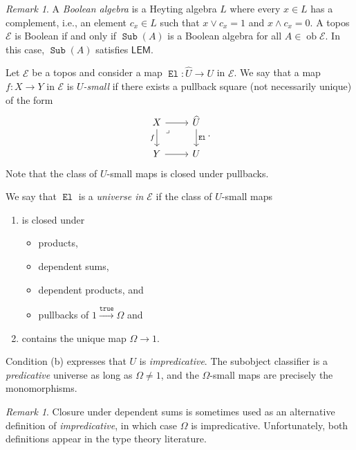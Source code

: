 \documentclass[10pt,letterpaper,cm]{nupset}
\theoremstyle{definition}
\theoremstyle{theorem}
\theoremstyle{remark}
\newtheorem{remark}[definition]{Remark}
\newcommand{\1}{\mathbf{1}}
\newcommand{\e}{\mathscr{E}}
\newcommand{\0}{\vec 0}
\DeclareMathOperator{\true}{\mathtt{true}}
\DeclareMathOperator{\ob}{ob}
\DeclareMathOperator{\el}{\mathtt{El}}
\DeclareMathOperator{\sub}{\mathtt{Sub}}
\newcommand{\bi}{\begin{itemize}}
\newcommand{\ei}{\end{itemize}}
\newcommand{\be}{\begin{enumerate}}
\newcommand{\ee}{\end{enumerate}}
\begin{document}
\begin{remark}
A \textit{Boolean algebra} is a Heyting algebra $L$ where every $x \in L$ has a complement, i.e., an element $c_x \in L$ such that $x \vee c_x = 1$ and $x \land c_x = 0$. A topos $\e$ is Boolean if and only if $\sub(A)$ is a Boolean algebra for all $A \in \ob{\e}$. In this case, $\sub(A)$ satisfies $\mathsf{LEM}$.
\end{remark}

\medskip

Let $\e$ be a topos and consider a map $\el : \widehat{U} \to U$ in $\e$. We say that a map $f: X \to Y$ in $\e$ is \textit{$U$-small} if there exists a pullback square (not necessarily unique) of the form  
\[
\begin{tikzcd}[ampersand replacement=\&]
	X \& {\widehat{U}} \\
	Y \& U
	\arrow["\el", from=1-2, to=2-2]
	\arrow[from=2-1, to=2-2]
	\arrow["f"', from=1-1, to=2-1]
	\arrow[from=1-1, to=1-2]
	\arrow["\lrcorner"{anchor=center, pos=0.125}, draw=none, from=1-1, to=2-2]
\end{tikzcd}
.\] Note that the class of $U$-small maps is closed under pullbacks.

\medskip

We say that $\el$ is a \textit{universe  in $\e$} if the class of $U$-small maps 
\be[label=(\alph*)]
\item is closed under  
\bi
\item products,  
\item dependent sums,
\item dependent products, and 
\item pullbacks of $1 \xrightarrow{\true} \Omega$ and
\ei
\item contains the unique map $\Omega \to 1$.
\ee 
Condition (b) expresses that $U$ is \textit{impredicative}.
The subobject classifier is a \emph{predicative} universe as long as $\Omega \ne 1$, and the $\Omega$-small maps are precisely the monomorphisms.

\begin{remark}
Closure under dependent sums is sometimes used as an alternative definition of \textit{impredicative}, in which case $\Omega$ is impredicative. Unfortunately, both definitions appear in the type theory literature.
\end{remark}
\end{document}
